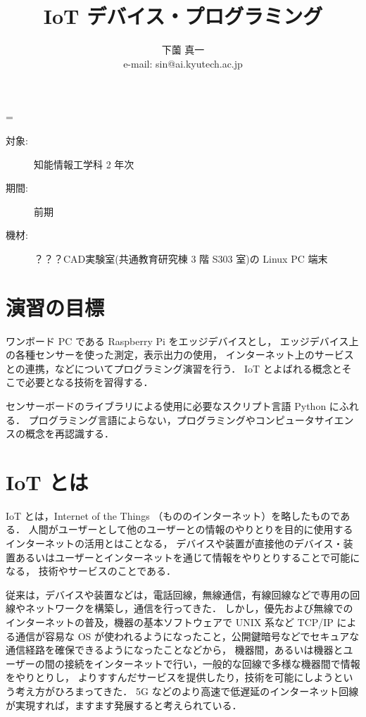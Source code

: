 \documentclass[11pt,a4,epsf]{report}
\title{{\bf IoT デバイス・プログラミング}}
\author{下薗 真一\\
e-mail: {\sf sin@ai.kyutech.ac.jp}\\
}
\def\linesparpage#1{\baselineskip=\textheight\divide\baselineskip#1}
\begin{document}
\linesparpage{36}
\maketitle

\medskip

\begin{description}
\item[対象:] 知能情報工学科 2 年次
\item[期間:] 前期
\item[機材:] ？？？CAD実験室(共通教育研究棟 3 階 S303 室)の Linux PC 端末%
\end{description}

\medskip

\section{演習の目標}

ワンボード PC である Raspberry Pi をエッジデバイスとし，
エッジデバイス上の各種センサーを使った測定，表示出力の使用，
インターネット上のサービスとの連携，などについてプログラミング演習を行う．
IoT とよばれる概念とそこで必要となる技術を習得する．

センサーボードのライブラリによる使用に必要なスクリプト言語 Python にふれる．
プログラミング言語によらない，プログラミングやコンピュータサイエンスの概念を再認識する．

\section{IoT とは}

IoT とは，Internet of the Things （もののインターネット）を略したものである．
人間がユーザーとして他のユーザーとの情報のやりとりを目的に使用するインターネットの活用とはことなる，
デバイスや装置が直接他のデバイス・装置あるいはユーザーとインターネットを通じて情報をやりとりすることで可能になる，
技術やサービスのことである．

従来は，デバイスや装置などは，電話回線，無線通信，有線回線などで専用の回線やネットワークを構築し，通信を行ってきた．
しかし，優先および無線でのインターネットの普及，機器の基本ソフトウェアで UNIX 系など TCP/IP による通信が容易な OS が使われるようになったこと，公開鍵暗号などでセキュアな通信経路を確保できるようになったことなどから，
機器間，あるいは機器とユーザーの間の接続をインターネットで行い，一般的な回線で多様な機器間で情報をやりとりし，
よりすすんだサービスを提供したり，技術を可能にしようという考え方がひろまってきた．
5G などのより高速で低遅延のインターネット回線が実現すれば，ますます発展すると考えられている．
\end{document}
